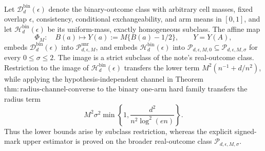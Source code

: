 Let \(\mathcal D_d^{\mathrm{bin}}(\epsilon)\) denote the binary-outcome class with arbitrary cell masses, fixed overlap \(\epsilon\), consistency, conditional exchangeability, and arm means in \([0,1]\), and let \(\mathcal H_d^{\mathrm{bin}}(\epsilon)\) be its uniform-mass, exactly homogeneous subclass.  The affine map
\[
 \Phi_M:\quad B(a)\longmapsto Y(a):=M\{B(a)-1/2\},\qquad Y=Y(A),
\]
embeds \(\mathcal D_d^{\mathrm{bin}}(\epsilon)\) into \(\mathcal P_{d,\epsilon,M}^{\mathrm{unr}}\), and embeds \(\mathcal H_d^{\mathrm{bin}}(\epsilon)\) into \(\mathcal P_{d,\epsilon,M,0}\subseteq\mathcal P_{d,\epsilon,M,\sigma}\) for every \(0\le\sigma\le2\).  The image is a strict subclass of the note's real-outcome class.  Restriction to the image of \(\mathcal H_d^{\mathrm{bin}}(\epsilon)\) transfers the lower term \(M^2(n^{-1}+d/n^2)\), while applying the hypothesis-independent channel in Theorem~\(\mathrm{thm:radius\text{-}channel\text{-}converse}\) to the binary one-arm hard family transfers the radius term
\[
 M^2\sigma^2\min\left\{1,\frac{d^2}{n^2\log^2(en)}\right\}.
\]
Thus the lower bounds arise by subclass restriction, whereas the explicit signed-mark upper estimator is proved on the broader real-outcome class \(\mathcal P_{d,\epsilon,M,\sigma}\).